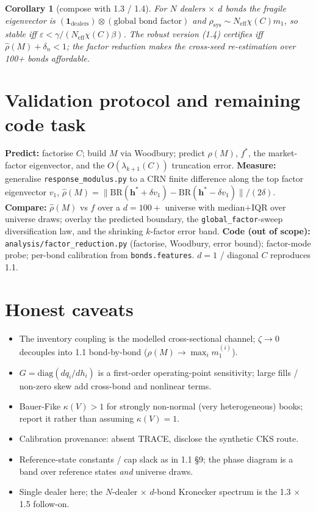 \documentclass[11pt]{article}
\newtheorem{corollary}{Corollary}
\newcommand{\eps}{\varepsilon}
\newcommand{\code}[1]{\texttt{#1}}
\newcommand{\BR}{\mathrm{BR}}
\newcommand{\Mmat}{M}
\newcommand{\diag}{\mathrm{diag}}
\newcommand{\bh}{\bm{h}}
\begin{document}
\begin{corollary}[compose with 1.3 / 1.4]
For $N$ dealers $\times$ $d$ bonds the fragile eigenvector is
$(\bm{1}_{\text{dealers}})\otimes(\text{global bond factor})$ and
$\rho_{\mathrm{sys}}\sim N_{\mathrm{eff}}\chi(C)m_1$, so stable iff
$\eps<\gamma/(N_{\mathrm{eff}}\chi(C)\beta)$. The robust version (1.4) certifies iff
$\hat\rho(\Mmat)+\delta_n<1$; the factor reduction makes the cross-seed re-estimation
over 100+ bonds affordable.
\end{corollary}

\section{Validation protocol and remaining code task}

\textbf{Predict:} factorise $C$; build $\Mmat$ via Woodbury; predict $\rho(\Mmat)$,
$f^*$, the market-factor eigenvector, and the $O(\lambda_{k+1}(C))$ truncation error.
\textbf{Measure:} generalise \code{response\_modulus.py} to a CRN finite difference
along the top factor eigenvector $v_1$,
$\hat\rho(\Mmat)=\|\BR(\bh^*+\delta v_1)-\BR(\bh^*-\delta v_1)\|/(2\delta)$.
\textbf{Compare:} $\hat\rho(\Mmat)$ vs $f$ over a $d=100+$ universe with median$+$IQR
over universe draws; overlay the predicted boundary, the \code{global\_factor}-sweep
diversification law, and the shrinking $k$-factor error band. \textbf{Code (out of
scope):} \code{analysis/factor\_reduction.py} (factorise, Woodbury, error bound);
factor-mode probe; per-bond calibration from \code{bonds.features}. $d=1$ / diagonal
$C$ reproduces 1.1.

\section{Honest caveats}
\begin{itemize}[leftmargin=1.4em]
  \item The inventory coupling is the modelled cross-sectional channel; $\zeta\to0$
  decouples into 1.1 bond-by-bond ($\rho(\Mmat)\to\max_i m_1^{(i)}$).
  \item $G=\diag(dq_i/dh_i)$ is a first-order operating-point sensitivity; large
  fills / non-zero skew add cross-bond and nonlinear terms.
  \item Bauer-Fike $\kappa(V)>1$ for strongly non-normal (very heterogeneous)
  books; report it rather than assuming $\kappa(V)=1$.
  \item Calibration provenance: absent TRACE, disclose the synthetic CKS route.
  \item Reference-state constants / cap slack as in 1.1 \S9; the phase diagram is a
  band over reference states \emph{and} universe draws.
  \item Single dealer here; the $N$-dealer $\times$ $d$-bond Kronecker spectrum is
  the 1.3 $\times$ 1.5 follow-on.
\end{itemize}
\end{document}
